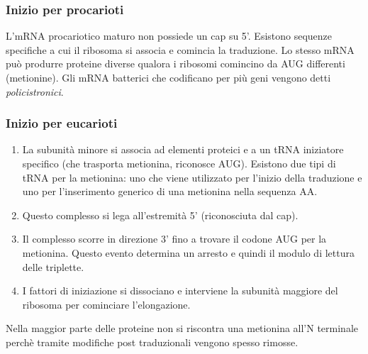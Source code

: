         \subsubsection{Inizio per procarioti}
            L'mRNA procariotico maturo non possiede un cap su 5'.
            Esistono sequenze specifiche a cui il ribosoma si associa e comincia la traduzione. Lo stesso mRNA può produrre proteine diverse qualora i ribosomi comincino da AUG differenti (metionine). Gli mRNA batterici che codificano per più geni vengono detti \textit{policistronici}.
        
        \subsubsection{Inizio per eucarioti}
            \begin{enumerate}
                \item La subunità minore si associa ad elementi proteici e a un tRNA iniziatore specifico (che trasporta metionina, riconosce AUG). Esistono due tipi di tRNA per la metionina: uno che viene utilizzato per l'inizio della traduzione e uno per l'inserimento generico di una metionina nella sequenza AA.
                \item Questo complesso si lega all'estremità 5' (riconosciuta dal cap).
                \item Il complesso scorre in direzione 3' fino a trovare il codone AUG per la metionina. Questo evento determina un arresto e quindi il modulo di lettura delle triplette.
                \item I fattori di iniziazione si dissociano e interviene la subunità maggiore del ribosoma per cominciare l'elongazione.
            \end{enumerate}
            Nella maggior parte delle proteine non si riscontra una metionina all'N terminale perchè tramite modifiche post traduzionali vengono spesso rimosse.
            
